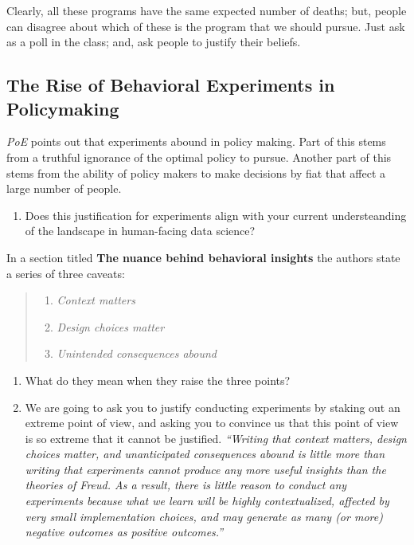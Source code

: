 \documentclass[
]{book}
\providecommand{\tightlist}{%
  \setlength{\itemsep}{0pt}\setlength{\parskip}{0pt}}
\begin{document}
Clearly, all these programs have the same expected number of deaths;
but, people can disagree about which of these is the program that we
should pursue. Just ask as a poll in the class; and, ask people to
justify their beliefs.

\hypertarget{the-rise-of-behavioral-experiments-in-policymaking}{%
\subsection{The Rise of Behavioral Experiments in
Policymaking}\label{the-rise-of-behavioral-experiments-in-policymaking}}

\emph{PoE} points out that experiments abound in policy making. Part of
this stems from a truthful ignorance of the optimal policy to pursue.
Another part of this stems from the ability of policy makers to make
decisions by fiat that affect a large number of people.

\begin{enumerate}
\def\labelenumi{\arabic{enumi}.}
\tightlist
\item
  Does this justification for experiments align with your current
  understeanding of the landscape in human-facing data science?
\end{enumerate}

In a section titled \textbf{The nuance behind behavioral insights} the
authors state a series of three caveats:

\begin{quote}
\begin{enumerate}
\def\labelenumi{\arabic{enumi}.}
\tightlist
\item
  \emph{Context matters}
\item
  \emph{Design choices matter}
\item
  \emph{Unintended consequences abound}
\end{enumerate}
\end{quote}

\begin{enumerate}
\def\labelenumi{\arabic{enumi}.}
\tightlist
\item
  What do they mean when they raise the three points?
\item
  We are going to ask you to justify conducting experiments by staking
  out an extreme point of view, and asking you to convince us that this
  point of view is so extreme that it cannot be justified.
  \emph{``Writing that context matters, design choices matter, and
  unanticipated consequences abound is little more than writing that
  experiments cannot produce any more useful insights than the theories
  of Freud. As a result, there is little reason to conduct any
  experiments because what we learn will be highly contextualized,
  affected by very small implementation choices, and may generate as
  many (or more) negative outcomes as positive outcomes.''}
\end{enumerate}
\end{document}
